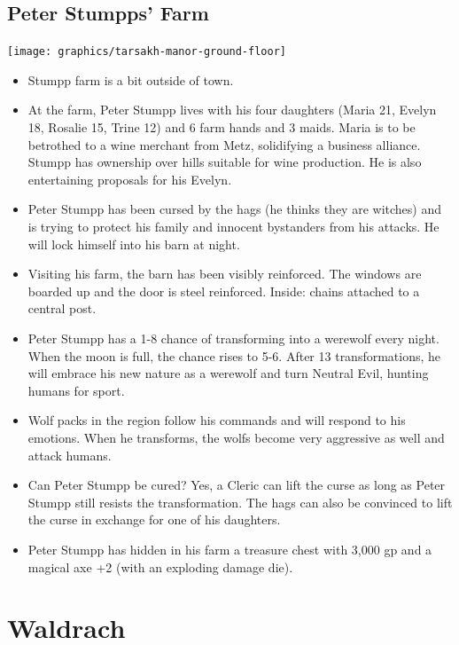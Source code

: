 \documentclass[
]{book}
\begin{document}
\section{Peter Stumpps' Farm}\label{farm}

\begin{center}\texttt{[image: graphics/tarsakh-manor-ground-floor]} \end{center}

\begin{itemize}
\item
  Stumpp farm is a bit outside of town.
\item
  At the farm, Peter Stumpp lives with his four daughters (Maria 21, Evelyn 18, Rosalie 15, Trine 12) and 6 farm hands and 3 maids. Maria is to be betrothed to a wine merchant from Metz, solidifying a business alliance. Stumpp has ownership over hills suitable for wine production. He is also entertaining proposals for his Evelyn.
\item
  Peter Stumpp has been cursed by the hags (he thinks they are witches) and is trying to protect his family and innocent bystanders from his attacks. He will lock himself into his barn at night.
\item
  Visiting his farm, the barn has been visibly reinforced. The windows are boarded up and the door is steel reinforced. Inside: chains attached to a central post.
\item
  Peter Stumpp has a 1-8 chance of transforming into a werewolf every night. When the moon is full, the chance rises to 5-6. After 13 transformations, he will embrace his new nature as a werewolf and turn Neutral Evil, hunting humans for sport.
\item
  Wolf packs in the region follow his commands and will respond to his emotions. When he transforms, the wolfs become very aggressive as well and attack humans.
\item
  Can Peter Stumpp be cured? Yes, a Cleric can lift the curse as long as Peter Stumpp still resists the transformation. The hags can also be convinced to lift the curse in exchange for one of his daughters.
\item
  Peter Stumpp has hidden in his farm a treasure chest with 3,000 gp and a magical axe +2 (with an exploding damage die).
\end{itemize}

\chapter{Waldrach}\label{waldrach}
\end{document}
